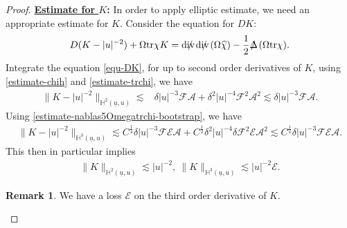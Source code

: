 \documentclass[11pt,reqno]{amsart}
\theoremstyle{definition}
\newtheorem{remark}{Remark}[section]
\numberwithin{equation}{section}
\newcommand{\tr}{\mathrm{tr}}
\renewcommand{\H}{\mathbb{H}}
\def\chih{\widehat{\chi}}
\def\etab{\underline{\eta}}
\def\mub{\underline{\mu}}
\def\tr{\mathrm{tr}}
\def\ub{\underline{u}}
\def\nablas{\mbox{$\nabla \mkern -13mu /$ }}
\def\Deltas{\mbox{$\Delta \mkern -13mu /$ }}
\def\divs{\mbox{$\mathrm{div} \mkern -13mu /$ }}
\begin{document}
\begin{proof} 

{\bf \underline{Estimate for $K$}:} In order to apply elliptic estimate, we need an appropriate estimate for $K$. Consider the equation for $DK$:
\begin{equation}\label{equ-DK}D(K-|u|^{-2})+\Omega\tr\chi K=\divs\divs(\Omega\chih)-\frac{1}{2}\Deltas(\Omega\tr\chi).\end{equation}
Integrate the equation \eqref{equ-DK}, for up to second order derivatives of $K$, using \eqref{estimate-chih} and \eqref{estimate-trchi}, we have
\begin{align}\label{estimate-K-lower}
\|K-|u|^{-2}\|_{\H^2(\ub,u)}\lesssim&\delta|u|^{-3}\mathscr{F}\mathcal{A}+\delta^2|u|^{-4}\mathscr{F}^2\mathcal{A}^2\lesssim\delta|u|^{-3}\mathscr{F}\mathcal{A}.
\end{align}
Using \eqref{estimate-nablas5Omegatrchi-bootstrap}, we have
\begin{align*}
\|K-|u|^{-2}\|_{\H^3(\ub,u)}\lesssim C^{\frac{1}{4}}\delta|u|^{-3}\mathscr{F}\mathscr{E}\mathcal{A}+C^{\frac{1}{2}}\delta^2|u|^{-4}\delta\mathscr{F}^2\mathscr{E}\mathcal{A}^2\lesssim C^{\frac{1}{4}}\delta|u|^{-3}\mathscr{F}\mathscr{E}\mathcal{A}.
\end{align*}
This then in particular implies
\begin{align}\label{estimate-K3}
\|K\|_{\H^2(\ub,u)}\lesssim|u|^{-2}, \ \|K\|_{\H^3(\ub,u)}\lesssim|u|^{-2}\mathscr{E}.
\end{align}
\begin{remark}
We have a loss $\mathscr{E}$ on the third order derivative of $K$.
\end{remark}




\end{proof}
\end{document}
